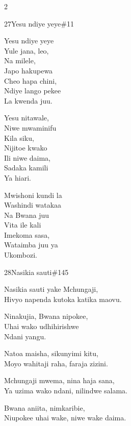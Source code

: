 \begin{multicols}{2}
\begin{hymn}{27}{Yesu ndiye yeye}{\#11}
\begin{stanza}
Yesu ndiye yeye\\
Yule jana, leo,\\
Na milele,\\
Japo hakupewa\\
Cheo hapa chini,\\
Ndiye lango pekee\\
La kwenda juu.
\end{stanza}
\begin{stanza}
Yesu nitawale,\\
Niwe mwaminifu\\
Kila siku,\\
Nijitoe kwako\\
Ili niwe daima,\\
Sadaka kamili\\
Ya hiari.
\end{stanza}
\begin{stanza}
Mwishoni kundi la\\
Washindi watakaa\\
Na Bwana juu\\
Vita ile kali\\
Imekoma sasa,\\
Wataimba juu ya\\
Ukombozi.
\end{stanza}
\end{hymn}

\begin{hymn}{28}{Nasikia sauti}{\#145}
\begin{stanza}
Nasikia sauti yake Mchungaji,\\
Hivyo napenda kutoka katika maovu.
\end{stanza}
\begin{chorus}
Ninakujia, Bwana nipokee,\\
Uhai wako udhihirishwe\\
Ndani yangu.
\end{chorus}
\begin{stanza}
Natoa maisha, sikunyimi kitu,\\
Moyo wahitaji raha, faraja zizini.
\end{stanza}
\begin{stanza}
Mchungaji mwema, nina haja sana,\\
Ya uzima wako ndani, nilindwe salama.
\end{stanza}
\begin{stanza}
Bwana aniita, nimkaribie,\\
Niupokee uhai wake, niwe wake daima.
\end{stanza}
\end{hymn}


\end{multicols}
